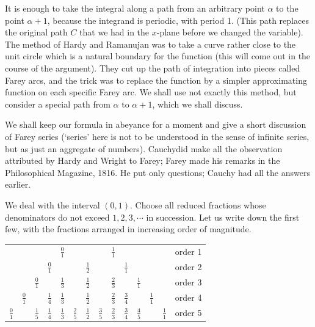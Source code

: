 It is enough to take the integral along a path from an arbitrary point
$\alpha$ to the point $\alpha+1$, because the integrand is periodic,
with period 1. (This path replaces the original path $C$ that we had
in the $x$-plane before we changed the variable). The method of Hardy
and Ramanujan was to take a curve rather close to the unit circle
which is a natural boundary for the function (this will come out in
the course of the argument). They cut up the path of integration into
pieces called Farey arcs, and the trick was to replace the function by
a simpler approximating function on each specific Farey arc. We shall
use not exactly this method, but consider a special path from $\alpha$
to $\alpha +1$, which we shall discuss.

We shall keep our formula in abeyance for a moment and give a short
discussion of Farey  series (`series' here is not to be understood in
the sense of infinite series, but as just an aggregate of
numbers). Cauchy\pageoriginale did make all the observation
attributed by Hardy and Wright to Farey; Farey made his remarks in the
Philosophical Magazine, 1816. He put only questions; Cauchy had all
the answers earlier.

We deal with the interval $(0, 1)$. Choose all reduced fractions whose
denominators do not exceed $1, 2, 3, \cdots $ in succession. Let us
write down the first few, with the fractions arranged in increasing
order of magnitude. 

\medskip
\noindent 
\tabcolsep=7pt
\begin{tabular}{cccccccccccccc}
 &&&&$\frac{0}{1}$&&&&$\frac{1}{1}$&&&&& order 1\\
 &&&$\frac{0}{1}$&&&$\frac{1}{2}$&&&$\frac{1}{1}$&&&& order 2\\
 &&$\frac{0}{1}$ &&$\frac{1}{3}$& &$\frac{1}{2}$& &$\frac{2}{3}$&
  &$\frac{1}{1}$  &&& order 3\\
 &$\frac{0}{1}$& &$\frac{1}{4}$&$\frac{1}{3}$& &$\frac{1}{2}$&
  &$\frac{2}{3}$ & $\frac{3}{4}$ & &$\frac{1}{1}$ & &order 4\\
 $\frac{0}{1}$ & &$\frac{1}{5}$ & $\frac{1}{4}$& $\frac{1}{3}$&
  $\frac{2}{5}$ & $\frac{1}{2}$ &$\frac{3}{5}$ &$\frac{2}{3}$
  &$\frac{3}{4}$ & $\frac{4}{5}$& &$\frac{1}{1}$& order 5
\end{tabular}
\medskip

